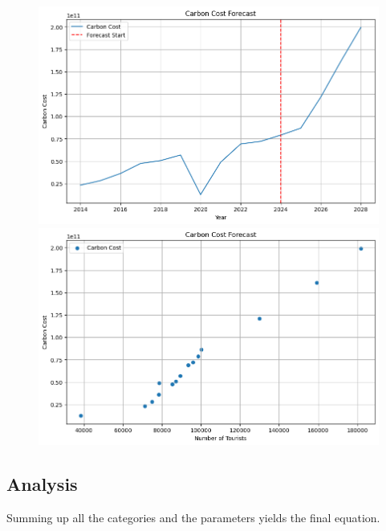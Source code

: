 \begin{figure}[H]
    \centering
    \begin{minipage}[t]{0.49\textwidth}
        \centering
        \includegraphics[width=1\textwidth]{C_Cost_Sitka.png}
    \end{minipage}
    \hfill
    \begin{minipage}[t]{0.49\textwidth}
        \centering
        \includegraphics[width=1\textwidth]{C_to_People_Sitka.png}
    \end{minipage}
\end{figure}

\subsection{Analysis}

Summing up all the categories and the parameters yields the final equation.

